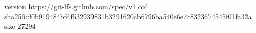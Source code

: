version https://git-lfs.github.com/spec/v1
oid sha256:d0b919484bfdf532939831b3291620cb6796ba540e6e7c8323674545f01fa32a
size 27294
